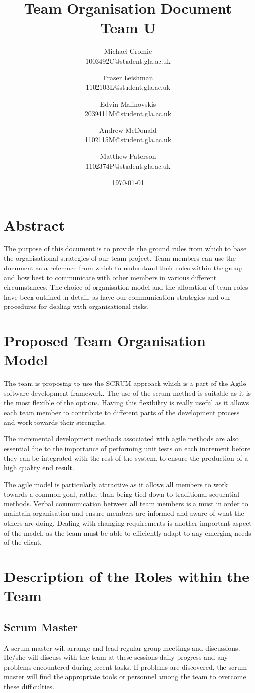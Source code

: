 \documentclass{article}
\title{Team Organisation Document\\Team U}
\author{
    Michael Cromie\\1003492C@student.gla.ac.uk
    \and
    Fraser Leishman\\1102103L@student.gla.ac.uk
    \and
    Edvin Malinovskis\\2039411M@student.gla.ac.uk
    \and
    Andrew McDonald\\1102115M@student.gla.ac.uk
    \and
    Matthew Paterson\\1102374P@student.gla.ac.uk   
}
\begin{document}
\date{\today}
\maketitle
\section{Abstract}
The purpose of this document is to provide the ground rules from which to base the organisational strategies of our team project. 
Team members can use the document as a reference from which to understand their roles within the group and how best to communicate with other members in various different circumstances. The choice of organisation model and the allocation of team roles have been outlined in detail, as have our communication strategies and our procedures for dealing with organisational risks.
\pagebreak

\section{Proposed Team Organisation Model}
The team is proposing to use the SCRUM approach which is a part of the Agile
software development framework.   The use of the scrum method is suitable as it
is the most flexible of the options. Having this flexibility is really useful
as it allows each team member to contribute to different parts of the
development process and work towards their strengths.


The incremental development methods associated with agile methods are also
essential due to the importance of performing unit tests on each increment
before they can be integrated with the rest of the system, to ensure the
production of a high quality end result.


The agile model is particularly attractive as it allows all members to work
towards a common goal, rather than being tied down to traditional sequential
methods. Verbal communication between all team members is a must in order to
maintain organisation and ensure members are informed and aware of what the
others are doing. Dealing with changing requirements is another important
aspect of the model, as the team must be able to efficiently adapt to any
emerging needs of the client. 

\section{Description of the Roles within the Team}
\subsection{Scrum Master}
A scrum master will arrange and lead regular group meetings and discussions.
He/she will discuss with the team at these sessions daily progress and any
problems encountered during recent tasks. If problems are discovered, the scrum
master will find the appropriate tools or personnel among the team to overcome
these difficulties.
\end{document}
